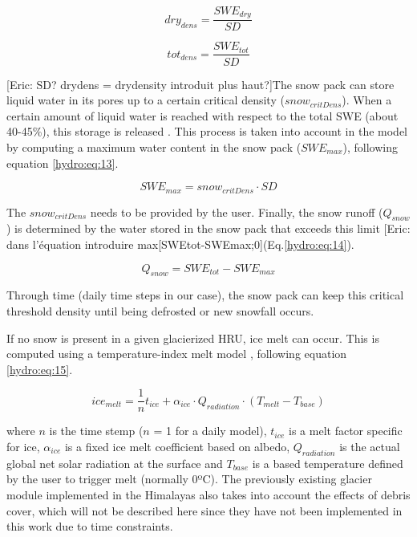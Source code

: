 \begin{equation} \label{hydro:eq:11}
dry_{dens} = \frac{SWE_{dry}}{SD}
\end{equation} 

\begin{equation} \label{hydro:eq:12}
tot_{dens} = \frac{SWE_{tot}}{SD}
\end{equation} 

[Eric: SD? drydens = drydensity introduit plus haut?]The snow pack can store liquid water in its pores up to a certain critical density ($snow_{critDens}$). When a certain amount of liquid water is reached with respect to the total SWE (about 40-45\%), this storage is released \citep{bertle_effect_1966}. This process is taken into account in the model by computing a maximum water content in the snow pack ($SWE_{max}$), following equation \ref{hydro:eq:13}.

\begin{equation} \label{hydro:eq:13}
SWE_{max} = snow_{critDens}\cdot SD
\end{equation} 

The $snow_{critDens}$ needs to be provided by the user. Finally, the snow runoff ($Q_{snow}$) is determined by the water stored in the snow pack that exceeds this limit [Eric: dans l'équation introduire max[SWEtot-SWEmax;0](Eq.\ref{hydro:eq:14}).

\begin{equation} \label{hydro:eq:14}
Q_{snow} = SWE_{tot} - SWE_{max}
\end{equation} 

Through time (daily time steps in our case), the snow pack can keep this critical threshold density until being defrosted or new snowfall occurs. 

If no snow is present in a given glacierized HRU, ice melt can occur. This is computed using a temperature-index melt model \citep{hock_temperature_2003}, following equation \ref{hydro:eq:15}.

\begin{equation} \label{hydro:eq:15}
ice_{melt} = \frac{1}{n}t_{ice} + \alpha_{ice } \cdot Q_{radiation} \cdot(T_{melt} - T_{base})
\end{equation} 

where $n$ is the time stemp ($n$ = 1 for a daily model), $t_{ice}$ is a melt factor specific for ice, $\alpha_{ice}$ is a fixed ice melt coefficient based on albedo, $Q_{radiation}$ is the actual global net solar radiation at the surface and $T_{base}$ is a based temperature defined by the user to trigger melt (normally 0ºC). The previously existing glacier module implemented in the Himalayas also takes into account the effects of debris cover, which will not be described here since they have not been implemented in this work due to time constraints. 

